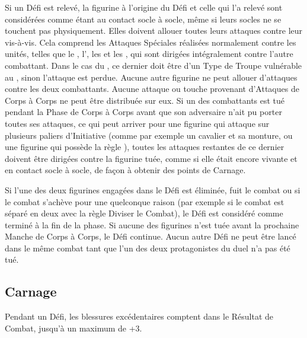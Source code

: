 Si un Défi est relevé, la figurine à l'origine du Défi et celle qui l'a relevé sont considérées comme étant au contact socle à socle, même si leurs socles ne se touchent pas physiquement. Elles doivent allouer toutes leurs attaques contre leur vis-à-vis. Cela comprend les Attaques Spéciales réalisées normalement contre les unités, telles que le \stomp{}, l'\breathweapon{}, les \impacthits{} et les \grindingattacks{}, qui sont dirigées intégralement contre l'autre combattant. Dans le cas du \stomp{}, ce dernier doit être d'un Type de Troupe vulnérable au \stomp{}, sinon l'attaque est perdue. Aucune autre figurine ne peut allouer d'attaques contre les deux combattants. Aucune attaque ou touche provenant d'Attaques de Corps à Corps ne peut être distribuée sur eux. Si un des combattants est tué pendant la Phase de Corps à Corps avant que son adversaire n'ait pu porter toutes ses attaques, ce qui peut arriver pour une figurine qui attaque sur plusieurs paliers d'Initiative (comme par exemple un cavalier et sa monture, ou une figurine qui possède la règle \stomp{}), toutes les attaques restantes de ce dernier doivent être dirigées contre la figurine tuée, comme si elle était encore vivante et en contact socle à socle, de façon à obtenir des points de Carnage.

Si l'une des deux figurines engagées dans le Défi est éliminée, fuit le combat ou si le combat s'achève pour une quelconque raison (par exemple si le combat est séparé en deux avec la règle Diviser le Combat), le Défi est considéré comme terminé à la fin de la phase. Si aucune des figurines n'est tuée avant la prochaine Manche de Corps à Corps, le Défi continue. Aucun autre Défi ne peut être lancé dans le même combat tant que l'un des deux protagonistes du duel n'a pas été tué.

\subsection{Carnage}

Pendant un Défi, les blessures excédentaires comptent dans le Résultat de Combat, jusqu'à un maximum de +3.
